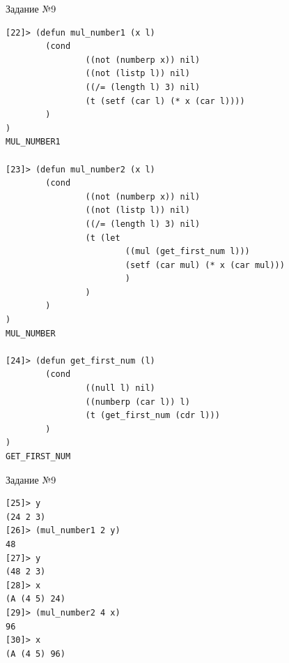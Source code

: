 \newpage

\begin{code}
\caption{Задание №9}
\label{code:bf4}
\begin{verbatim}
[22]> (defun mul_number1 (x l)
        (cond
                ((not (numberp x)) nil)
                ((not (listp l)) nil)
                ((/= (length l) 3) nil)
                (t (setf (car l) (* x (car l))))
        )
)
MUL_NUMBER1

[23]> (defun mul_number2 (x l)
        (cond
                ((not (numberp x)) nil)
                ((not (listp l)) nil)
                ((/= (length l) 3) nil)
                (t (let
                        ((mul (get_first_num l)))
                        (setf (car mul) (* x (car mul)))
                        )
                )
        )
)
MUL_NUMBER

[24]> (defun get_first_num (l)
        (cond
                ((null l) nil)
                ((numberp (car l)) l)
                (t (get_first_num (cdr l)))
        )
)
GET_FIRST_NUM
\end{verbatim}
\end{code}

\newpage

\begin{code}
\caption{Задание №9}
\label{code:bf4}
\begin{verbatim}
[25]> y
(24 2 3)
[26]> (mul_number1 2 y)
48
[27]> y
(48 2 3)
[28]> x
(A (4 5) 24)
[29]> (mul_number2 4 x)
96
[30]> x
(A (4 5) 96)
\end{verbatim}
\end{code}
